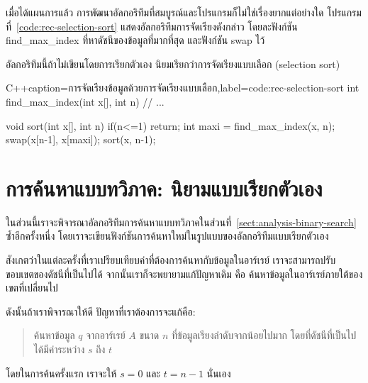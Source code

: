 เมื่อ{\wbr}ได้{\wbr}แผนการ{\wbr}แล้ว การ{\wbr}พัฒนา{\wbr}อัล{\wbr}กอ{\wbr}ริ{\wbr}ทึม{\wbr}ที่{\wbr}สมบูรณ์{\wbr}และ{\wbr}โปรแกรม{\wbr}ก็{\wbr}ไม่{\wbr}ใช่{\wbr}เรื่อง{\wbr}ยาก{\wbr}แต่อย่างใด{\wbr}
โปรแกรม{\wbr}ที่~\ref{code:rec-selection-sort} แสดง{\wbr}อัล{\wbr}กอ{\wbr}ริ{\wbr}ทึม{\wbr}การ{\wbr}จัดเรียง{\wbr}ดังกล่าว{\wbr}
โดย{\wbr}ละ{\wbr}ฟังก์ชัน {\ct find\_max\_index} ที่{\wbr}หา{\wbr}ดัชนี{\wbr}ของ{\wbr}ข้อมูล{\wbr}ที่{\wbr}มาก{\wbr}ที่สุด และ{\wbr}ฟังก์ชัน {\ct
  swap} ไว้{\wbr}

อัล{\wbr}กอ{\wbr}ริ{\wbr}ทึม{\wbr}นี้{\wbr}ถ้า{\wbr}ไม่{\wbr}เขียน{\wbr}โดย{\wbr}การ{\wbr}เรียก{\wbr}ตัวเอง นิยม{\wbr}เรียก{\wbr}ว่า{\wbr}การ{\wbr}จัดเรียง{\wbr}แบบ{\wbr}เลือก (selection
sort)

\latintext
\begin{codelist}{C++}{caption={\thaitext การ{\wbr}จัดเรียง{\wbr}ข้อมูล{\wbr}ด้วย{\wbr}การ{\wbr}จัดเรียง{\wbr}แบบ{\wbr}เลือก\latintext},label=code:rec-selection-sort}
int find_max_index(int x[], int n) { // ... }

void sort(int x[], int n)
{
  if(n<=1)
    return;
  int maxi = find_max_index(x, n);
  swap(x[n-1], x[maxi]);
  sort(x, n-1);
}
\end{codelist}
\thaitext

\section{การ{\wbr}ค้นหา{\wbr}แบบ{\wbr}ทวิภาค: นิยาม{\wbr}แบบ{\wbr}เรียก{\wbr}ตัวเอง}
\label{sect:rec-binary-search-revisited}

ใน{\wbr}ส่วน{\wbr}นี้{\wbr}เรา{\wbr}จะ{\wbr}พิจารณา{\wbr}อัล{\wbr}กอ{\wbr}ริ{\wbr}ทึม{\wbr}การ{\wbr}ค้นหา{\wbr}แบบ{\wbr}ทวิภาค{\wbr}ใน{\wbr}ส่วน{\wbr}ที่~\ref{sect:analysis-binary-search}
ซ้ำ{\wbr}อีก{\wbr}ครั้ง{\wbr}หนึ่ง โดย{\wbr}เรา{\wbr}จะ{\wbr}เขียน{\wbr}ฟังก์ชัน{\wbr}การ{\wbr}ค้นหา{\wbr}ใหม่{\wbr}ใน{\wbr}รูปแบบ{\wbr}ของ{\wbr}อัล{\wbr}กอ{\wbr}ริ{\wbr}ทึม{\wbr}แบบ{\wbr}เรียก{\wbr}ตัวเอง{\wbr}

สังเกต{\wbr}ว่า{\wbr}ใน{\wbr}แต่ละ{\wbr}ครั้ง{\wbr}ที่{\wbr}เรา{\wbr}เปรียบเทียบ{\wbr}ค่า{\wbr}ที่{\wbr}ต้องการ{\wbr}ค้นหา{\wbr}กับ{\wbr}ข้อมูล{\wbr}ใน{\wbr}อาร์เรย์
เรา{\wbr}จะ{\wbr}สามารถ{\wbr}ปรับ{\wbr}ขอบเขต{\wbr}ของ{\wbr}ดัชนี{\wbr}ที่{\wbr}เป็น{\wbr}ไป{\wbr}ได้ จากนั้น{\wbr}เรา{\wbr}ก็{\wbr}จะ{\wbr}พยายาม{\wbr}แก้{\wbr}ปัญหา{\wbr}เดิม คือ{\wbr}
ค้นหา{\wbr}ข้อมูล{\wbr}ใน{\wbr}อาร์เรย์{\wbr}ภายใต้{\wbr}ของ{\wbr}เขต{\wbr}ที่{\wbr}เปลี่ยน{\wbr}ไป{\wbr}

ดังนั้น{\wbr}ถ้า{\wbr}เรา{\wbr}พิจารณา{\wbr}ให้{\wbr}ดี ปัญหา{\wbr}ที่{\wbr}เรา{\wbr}ต้องการ{\wbr}จะ{\wbr}แก้{\wbr}คือ:
\begin{quote}
ค้นหา{\wbr}ข้อมูล $q$ จาก{\wbr}อาร์เรย์ $A$ ขนาด $n$ ที่{\wbr}ข้อมูล{\wbr}เรียงลำดับ{\wbr}จาก{\wbr}น้อย{\wbr}ไป{\wbr}มาก{\wbr}
โดย{\wbr}ที่{\wbr}ดัชนี{\wbr}ที่{\wbr}เป็น{\wbr}ไป{\wbr}ได้{\wbr}มี{\wbr}ค่า{\wbr}ระหว่าง $s$ ถึง $t$
\end{quote}
โดย{\wbr}ใน{\wbr}การ{\wbr}ค้น{\wbr}ครั้ง{\wbr}แรก เรา{\wbr}จะ{\wbr}ให้ $s=0$ และ $t=n-1$ นั่นเอง{\wbr}

